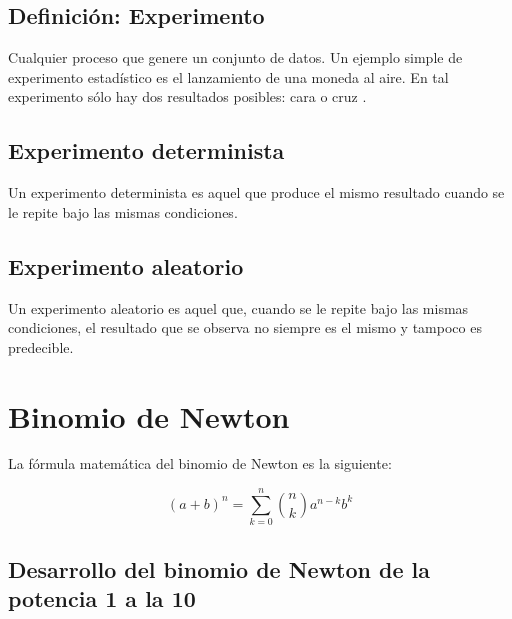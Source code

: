 \documentclass{article}
\begin{document}
\subsection{Definici\'on: Experimento}

Cualquier proceso que genere un conjunto de datos. Un ejemplo simple de
experimento estad\'istico es el lanzamiento de una moneda al aire. En tal
experimento s\'olo hay dos resultados posibles: cara o cruz
\cite{walpole2012probabilidad}.

\subsection{Experimento determinista}
Un experimento determinista es aquel que produce el mismo resultado cuando se le
repite bajo las mismas condiciones.

\subsection{Experimento aleatorio}
Un experimento aleatorio es aquel que, cuando se le repite bajo las mismas
condiciones, el resultado que se observa no siempre es el mismo y tampoco es
predecible.

\section{Binomio de Newton}

La fórmula matemática del binomio de Newton es la siguiente:

\begin{equation}
    (a+b)^n = \sum_{k=0}^{n} \binom{n}{k} a^{n-k} b^k
\end{equation}

\subsection{Desarrollo del binomio de Newton de la potencia 1 a la 10}
\end{document}
